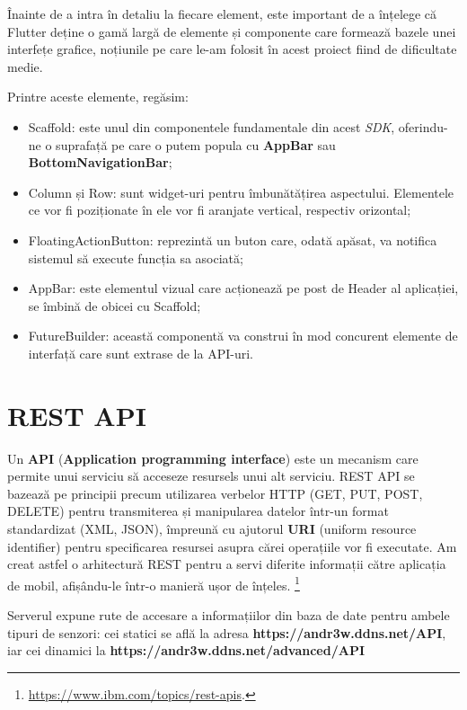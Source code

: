 Înainte de a intra în detaliu la fiecare element, este important de a înțelege că Flutter deține o gamă largă de elemente și componente care formează bazele unei interfețe grafice, noțiunile pe care le-am folosit în acest proiect fiind de dificultate medie.

Printre aceste elemente, regăsim:
\begin{itemize}
	\item Scaffold: este unul din componentele fundamentale din acest \emph{SDK}, oferindu-ne o suprafață pe care o putem popula cu \textbf{AppBar} sau \textbf{BottomNavigationBar};
	
	\item Column și Row: sunt widget-uri pentru îmbunătățirea aspectului. Elementele ce vor fi poziționate în ele vor fi aranjate vertical, respectiv orizontal;
	
	\item FloatingActionButton: reprezintă un buton care, odată apăsat, va notifica sistemul să execute funcția sa asociată;
	
	\item AppBar: este elementul vizual care acționează pe post de Header al aplicației, se îmbină de obicei cu Scaffold;
	
	\item FutureBuilder: această componentă va construi în mod concurent elemente de interfață care sunt extrase de la API-uri.
\end{itemize}

\section{REST API}

Un \textbf{API} (\textbf{Application programming interface}) este un mecanism care permite unui serviciu să acceseze resursels unui alt serviciu. REST API se bazează pe principii precum utilizarea verbelor HTTP (GET, PUT, POST, DELETE) pentru transmiterea și manipularea datelor într-un format standardizat (XML, JSON), împreună cu ajutorul \textbf{URI} (uniform resource identifier) pentru specificarea resursei asupra cărei operațiile vor fi executate. Am creat astfel o arhitectură REST pentru a servi diferite informații către aplicația de mobil, afișându-le într-o manieră ușor de înțeles. \footnote{\url{https://www.ibm.com/topics/rest-apis}.}

Serverul expune rute de accesare a informațiilor din baza de date pentru ambele tipuri de senzori: cei statici se află la adresa \textbf{https://andr3w.ddns.net/API}, iar cei dinamici la \textbf{https://andr3w.ddns.net/advanced/API}

